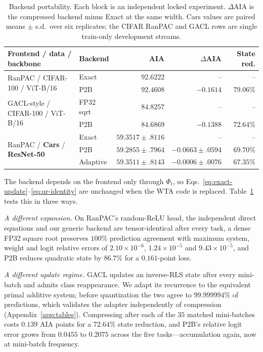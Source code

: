 \documentclass{article}
\begin{document}
\begin{table}[t]
\caption{Backend portability. Each block is an independent locked experiment.
$\Delta$AIA is the compressed backend minus Exact at the same width. Cars
values are paired means $\pm$ s.d.\ over six replicates; the CIFAR RanPAC and
GACL rows are single train-only development streams.}
\label{tab:portability}
\centering
\small
\begin{tabular}{llrrr}
\toprule
Frontend / data / backbone & Backend & AIA & $\Delta$AIA & State red.\\
\midrule
\multirow{2}{*}{RanPAC / CIFAR-100 / ViT-B/16}
 & Exact & $92.6222$ & -- & --\\
 & P2B   & $92.4608$ & $-0.1614$ & $79.06\%$\\
\midrule
\multirow{2}{*}{GACL-style / CIFAR-100 / ViT-B/16}
 & FP32 sqrt & $84.8257$ & -- & --\\
 & P2B       & $84.6869$ & $-0.1388$ & $72.64\%$\\
\midrule
\multirow{3}{*}{RanPAC / \textbf{Cars} / \textbf{ResNet-50}}
 & Exact    & $59.3517\pm.8116$ & -- & --\\
 & P2B      & $59.2855\pm.7964$ & $-0.0663\pm.0594$ & $69.70\%$\\
 & Adaptive & $59.3511\pm.8143$ & $-0.0006\pm.0076$ & $67.35\%$\\
\bottomrule
\end{tabular}
\end{table}

The backend depends on the frontend only through $\Phi_t$, so
Eqs.~\ref{eq:exact-update}--\ref{eq:qr-identity} are unchanged when the WTA
code is replaced. Table~\ref{tab:portability} tests this in three ways.

\emph{A different expansion.} On RanPAC's random-ReLU head, the independent
direct equations and our generic backend are tensor-identical after every task,
a dense FP32 square root preserves $100\%$ prediction agreement with maximum
system, weight and logit relative errors of $2.10\times10^{-6}$,
$1.24\times10^{-5}$ and $9.43\times10^{-5}$, and P2B reduces quadratic state by
$86.7\%$ for a $0.161$-point loss.

\emph{A different update regime.} GACL updates an inverse-RLS state after every
mini-batch and admits class reappearance. We adapt its recurrence to the
equivalent primal additive system; before quantization the two agree to
$99.999994\%$ of predictions, which validates the adapter independently of
compression (Appendix~\ref{app:tables}). Compressing after each of the $35$
matched mini-batches costs $0.139$ AIA points for a $72.64\%$ state reduction,
and P2B's relative logit error grows from $0.0455$ to $0.2075$ across the five
tasks---accumulation again, now at mini-batch frequency.
\end{document}
